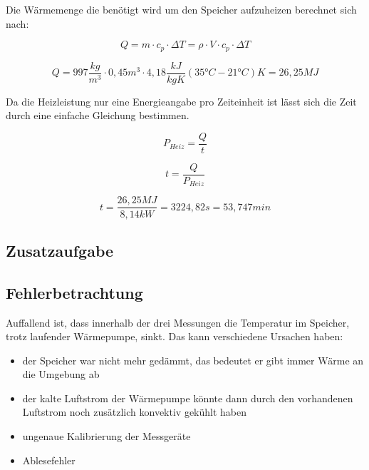 Die Wärmemenge die benötigt wird um den Speicher aufzuheizen berechnet sich nach:

\begin{equation}
Q = m \cdot c_p \cdot \Delta T = \rho \cdot V \cdot c_p \cdot \Delta T
\end{equation}

$$ Q = 997 \frac{kg}{m^3} \cdot 0,45 m^3 \cdot 4,18 \frac{kJ}{kg K} (35 \text{°} C-21 \text{°} C)K=26,25 MJ$$

Da die Heizleistung nur eine Energieangabe pro Zeiteinheit ist lässt sich die Zeit durch eine einfache Gleichung bestimmen.

\begin{equation}
    P_{Heiz}= \frac{Q}{t}
\end{equation}

\begin{equation}
 t = \frac{Q}{P_{Heiz}}
\end{equation}

$$ t= \frac{26,25 MJ}{8,14 kW}=3224,82 s= 53,747 min$$

\subsection{Zusatzaufgabe}

\subsection{Fehlerbetrachtung}
Auffallend ist, dass innerhalb der drei Messungen die Temperatur im Speicher,
trotz laufender Wärmepumpe, sinkt. Das kann verschiedene Ursachen haben:
\begin{itemize}
    \item der Speicher war nicht mehr gedämmt, das bedeutet er gibt immer Wärme an die Umgebung ab
    \item der kalte Luftstrom der Wärmepumpe könnte dann durch den vorhandenen Luftstrom noch zusätzlich konvektiv gekühlt haben 
\item ungenaue Kalibrierung der Messgeräte
\item Ablesefehler
\end{itemize}


